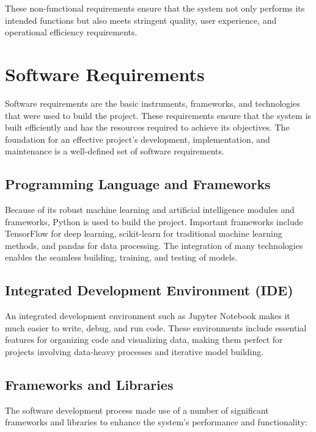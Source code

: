 These non-functional requirements ensure that the system not only performs its intended functions but also meets stringent quality, user experience, and operational efficiency requirements.

\section{Software Requirements}
Software requirements are the basic instruments, frameworks, and technologies that were used to build the project. These requirements ensure that the system is built efficiently and has the resources required to achieve its objectives. The foundation for an effective project's development, implementation, and maintenance is a well-defined set of software requirements.

\subsection{Programming Language and Frameworks}
Because of its robust machine learning and artificial intelligence modules and frameworks, Python is used to build the project. Important frameworks include TensorFlow for deep learning, scikit-learn for traditional machine learning methods, and pandas for data processing. The integration of many technologies enables the seamless building, training, and testing of models.

\subsection{Integrated Development Environment (IDE)}
An integrated development environment such as Jupyter Notebook makes it much easier to write, debug, and run code. These environments include essential features for organizing code and visualizing data, making them perfect for projects involving data-heavy processes and iterative model building.



\subsection{Frameworks and Libraries}
The software development process made use of a number of significant frameworks and libraries to enhance the system's performance and functionality:

